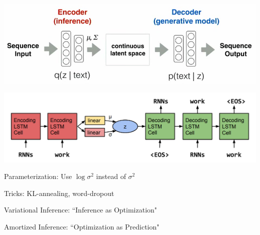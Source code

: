\documentclass{beamer}
\let\tempone\itemize
\let\temptwo\enditemize
\renewenvironment{itemize}{\tempone\addtolength{\itemsep}{0.5\baselineskip}}{\temptwo}
\begin{document}
\begin{frame}
  \begin{center}
   \end{center}
   \center
   \includegraphics[scale=0.35]{text-vae} \\

\end{frame}

\begin{frame}
  \begin{center}
   \end{center}
   \center
   \includegraphics[scale=0.3]{lstmvae} 
  \\
     \vspace{5mm}
\end{frame}

\begin{frame}
  \begin{center}
   \end{center}
\begin{itemize}
\item Parameterization: Use $\log \sigma^2$ instead of $\sigma^2$ 
\item Tricks: KL-annealing, word-dropout
\end{itemize}
\end{frame}

\begin{frame}
  \begin{center}
   \end{center}
\begin{itemize}
\item Variational Inference: ``Inference as Optimization"
\item Amortized  Inference: ``Optimization as Prediction"
\end{itemize}
\end{frame}
\end{document}
